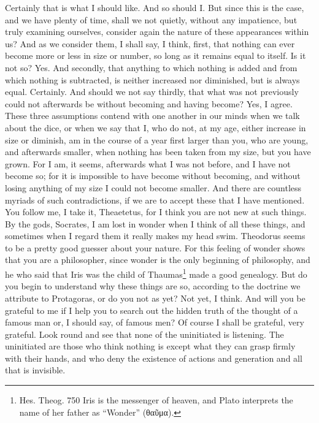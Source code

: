 \documentclass[letterpaper,12pt]{article}
\newcommand{\textgreek}[1]{\begingroup\fontencoding{LGR}\selectfont#1\endgroup}
\newcommand{\stephpag}[1]{\marginnote{\small\itshape\fontfamily{ppl}\selectfont #1}}
\begin{document}
\begin{drama}
\theaetetusspeaks
Certainly that is what I should like.
\socratesspeaks
And so should I. But since this is the case, and we have plenty of time, shall we not quietly, without any impatience, but truly examining ourselves, \stephpag{155 a} consider again the nature of these appearances within us? And as we consider them, I shall say, I think, first, that nothing can ever become more or less in size or number, so long as it remains equal to itself. Is it not so?
\theaetetusspeaks
Yes.
\socratesspeaks
And secondly, that anything to which nothing is added and from which nothing is subtracted, is neither increased nor diminished, but is always equal.
\theaetetusspeaks
Certainly. \stephpag{b}
\socratesspeaks
And should we not say thirdly, that what was not previously could not afterwards be without becoming and having become?
\theaetetusspeaks
Yes, I agree.
\socratesspeaks
These three assumptions contend with one another in our minds when we talk about the dice, or when we say that I, who do not, at my age, either increase in size or diminish, am in the course of a year first larger than you, who are young, and afterwards smaller, when nothing has been taken from my size, \stephpag{c} but you have grown. For I am, it seems, afterwards what I was not before, and I have not become so; for it is impossible to have become without becoming, and without losing anything of my size I could not become smaller. And there are countless myriads of such contradictions, if we are to accept these that I have mentioned. You follow me, I take it, Theaetetus, for I think you are not new at such things.
\theaetetusspeaks
By the gods, Socrates, I am lost in wonder when I think of all these things, and sometimes when I regard them it really makes my head swim. \stephpag{d}
\socratesspeaks
Theodorus seems to be a pretty good guesser about your nature. For this feeling of wonder shows that you are a philosopher, since wonder is the only beginning of philosophy, and he who said that Iris was the child of Thaumas\footnote{Hes. Theog. 750 Iris is the messenger of heaven, and Plato interprets the name of her father as ``Wonder'' (\textgreek{θαῦμα}).} made a good genealogy. But do you begin to understand why these things are so, according to the doctrine we attribute to Protagoras, or do you not as yet?
\theaetetusspeaks
Not yet, I think.
\socratesspeaks
And will you be grateful to me if I help you \stephpag{e} to search out the hidden truth of the thought of a famous man or, I should say, of famous men?
\theaetetusspeaks
Of course I shall be grateful, very grateful.
\socratesspeaks
Look round and see that none of the uninitiated is listening. The uninitiated are those who think nothing is except what they can grasp firmly with their hands, and who deny the existence of actions and generation and all that is invisible.

\end{drama}
\end{document}
